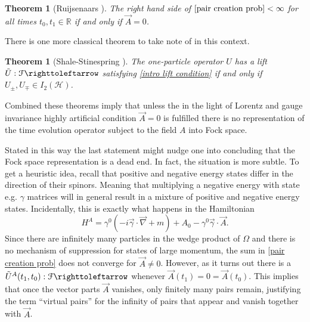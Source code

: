 \documentclass[b5paper,draft,openbib,12pt]{memoir}
\newtheorem{Thm}[Def]{Theorem}
\begin{document}
\begin{Thm}[Ruijsenaars \cite{ruijsenaars1977charged}]\label{thm ruisnaar}
The right hand side of \(\eqref{pair creation prob}<\infty\)
for all times \(t_0,t_1\in\mathbb{R}\)
if and only if \(\vec{A}=0\).
\end{Thm}

There is one more classical theorem to take note of in this context.

\begin{Thm}[Shale-Stinespring \cite{shale1965spinor}]\label{thm shale stinepsirng}
The one-particle operator \(U\) has a lift 
\(\tilde{U}:\mathcal{F}\righttoleftarrow\) satisfying 
\eqref{intro lift condition} if and only if 
\(U_{\pm}, U_{\mp}\in I_2(\mathcal{H})\). 
\end{Thm}

Combined these theorems imply that unless the in the light of  
Lorentz and gauge invariance
highly artificial condition \(\vec{A}=0\) is 
fulfilled there is no representation of the time evolution 
operator subject to the field \(A\) into Fock space. 

Stated in this way the last statement might nudge one
into concluding that the Fock space representation 
is a dead end. In fact, the situation is more subtle. 
To get a heuristic idea, recall that positive and negative 
energy states differ in the direction of their spinors. 
Meaning that multiplying a negative energy  with state
e.g. \(\gamma\) matrices will in general result in 
a mixture of positive and negative energy states. 
Incidentally, this is exactly what happens in the Hamiltonian 
\begin{equation}
H^A=\gamma^0(-i\vec{\gamma}\cdot \vec{\nabla} +m) + A_0 -\gamma^0\vec{\gamma}\cdot\vec{A}.
\end{equation}
Since there are infinitely many particles in the wedge 
product of \(\Omega\) and there is no mechanism of suppression 
for states of large momentum, the sum in 
\eqref{pair creation prob} does not converge for \(\vec{A}\neq 0\).
However, as it turns out
there is a \(\tilde{U}^A(t_1,t_0):\mathcal{F}\righttoleftarrow\)
whenever \(\vec{A}(t_1)=0=\vec{A}(t_0)\). This implies 
that once the vector parts \(\vec{A}\) vanishes, only 
finitely many pairs remain, justifying the term ``virtual pairs''
for the infinity of pairs that appear and vanish together with 
\(\vec{A}\).
\end{document}
